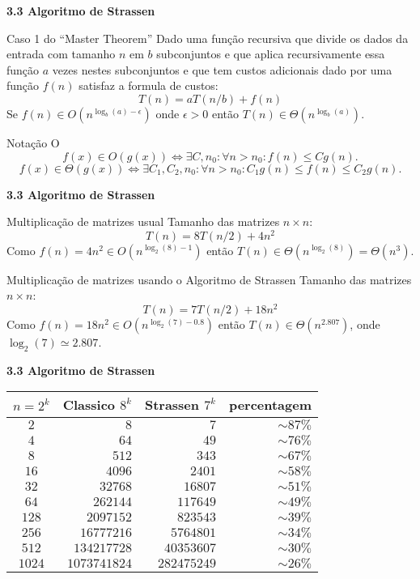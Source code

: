 \documentclass{beamer}
\begin{document}
\begin{frame}{\bf 3.3 Algoritmo de Strassen}
\begin{block}{Caso 1 do ``Master Theorem''}
Dado uma função recursiva que divide os dados da entrada com tamanho $n$ em $b$ subconjuntos e que aplica recursivamente essa função $a$ vezes nestes subconjuntos e que tem custos adicionais dado por uma função $f(n)$ satisfaz a formula de custos:
$$T(n)=aT(n/b)+f(n)$$
Se $f(n) \in O(n^{\log_b(a) - \epsilon})$ onde $\epsilon >0$ então $T(n) \in \Theta(n^{\log_b(a)})$. 
\end{block}

\begin{block}{Notação O}
$$f(x)\in O(g(x)) \Leftrightarrow \exists C, n_0: \forall n>n_0: f(n)\leq C g(n).$$
$$f(x)\in \Theta(g(x)) \Leftrightarrow \exists C_1,C_2, n_0: \forall n>n_0: C_1g(n)\leq f(n)\leq C_2g(n).$$
\end{block}
\end{frame}

\begin{frame}{\bf 3.3 Algoritmo de Strassen}
\begin{block}{Multiplicação de matrizes usual}
Tamanho das matrizes $n\times n$:
$$T(n) = 8 T(n/2) + 4n^2$$
Como $f(n) = 4n^2 \in O(n^{\log_2(8) - 1})$ então $T(n) \in \Theta(n^{\log_2(8)})=\Theta(n^3)$. 
\end{block}

\begin{block}{Multiplicação de matrizes usando o Algoritmo de Strassen}
Tamanho das matrizes $n\times n$:
$$T(n) = 7 T(n/2) + 18n^2$$
Como $f(n) = 18n^2 \in O(n^{\log_2(7)-0.8})$ então $T(n) \in \Theta(n^{2.807})$, onde $\log_2(7) \simeq 2.807$.
\end{block}

\end{frame}

\begin{frame}{\bf 3.3 Algoritmo de Strassen}

\begin{tabular}{|c|r|r|r|}\hline
$n=2^k$ & Classico $8^k$& Strassen $7^k$ & percentagem \\\hline
$2$ & $8$ & $7$ & $\sim 87\%$\\\hline
$4$ & $64$ & $49$ & $\sim 76\%$ \\\hline
$8$ & $512$ & $343$ & $\sim 67\%$\\\hline
$16$ & $4096$ & $2401$ & $\sim 58\%$\\\hline
$32$ & $32768$ & $16807$ & $\sim 51\%$\\\hline
$64$ & $262144$ & $117649$ & $\sim 49\%$ \\\hline
$128$ & $2097152$ & $823543$ & $\sim 39\%$\\\hline
$256$ & $16777216$ & $5764801$ & $\sim 34\%$\\\hline
$512$ & $134217728$ & $40353607$ & $\sim 30\%$\\\hline
$1024$ & $1073741824$ & $282475249$ & $\sim 26\%$\\\hline
\end{tabular}
\end{frame}
\end{document}
